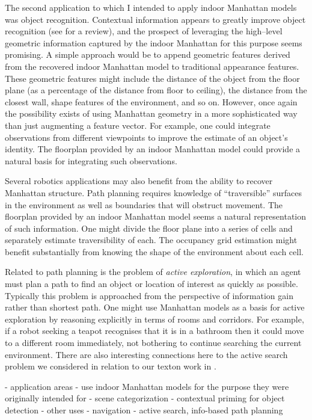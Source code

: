 The second application to which I intended to apply indoor Manhattan
models was object recognition. Contextual information appears to
greatly improve object recognition (see  for a
review), and the prospect of leveraging the high--level geometric
information captured by the indoor Manhattan for this purpose seems
promising. A simple approach would be to append geometric features
derived from the recovered indoor Manhattan model to traditional
appearance features. These geometric features might include the
distance of the object from the floor plane (as a percentage of the
distance from floor to ceiling), the distance from the closest wall,
shape features of the environment, and so on. However, once again the
possibility exists of using Manhattan geometry in a more sophisticated
way than just augmenting a feature vector. For example, one could
integrate observations from different viewpoints to improve the
estimate of an object's identity. The floorplan provided by an indoor
Manhattan model could provide a natural basis for integrating such
observations.

Several robotics applications may also benefit from the ability to
recover Manhattan structure. Path planning requires knowledge of
``traversible'' surfaces in the environment as well as boundaries that
will obstruct movement. The floorplan provided by an indoor Manhattan
model seems a natural representation of such information. One might
divide the floor plane into a series of cells and separately estimate
traversibility of each. The occupancy grid estimation might benefit
substantially from knowing the shape of the environment about each
cell.

Related to path planning is the problem of \textit{active
  exploration}, in which an agent must plan a path to find an object
or location of interest as quickly as possible. Typically this problem
is approached from the perspective of information gain rather than
shortest path. One might use Manhattan models as a basis for active
exploration by reasoning explicitly in terms of rooms and
corridors. For example, if a robot seeking a teapot recognises that it
is in a bathroom then it could move to a different room immediately,
not bothering to continue searching the current environment. There are
also interesting connections here to the active search problem we
considered in relation to our texton work in
.

  - application areas
    - use indoor Manhattan models for the purpose they were originally intended for
      - scene categorization
      - contextual priming for object detection
    - other uses
      - navigation
      - active search, info-based path planning

